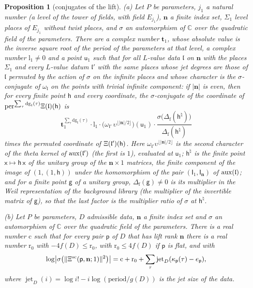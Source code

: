 \documentclass[11pt,a4paper]{article}
\newcommand{\kw}[1]{\emph{#1}}
\theoremstyle{plainx}
\newtheorem{proposition}[theorem]{Proposition}
\theoremstyle{uprightx}
\newcommand{\bn}{\mathbf{n}}
\newcommand{\sI}{\mathsf{I}}
\newcommand{\sg}{\mathsf{g}}
\newcommand{\sh}{\mathsf{h}}
\newcommand{\sx}{\mathsf{x}}
\newcommand{\pp}{\mathsf{p}}
\newcommand{\fl}{\mathfrak{l}}
\newcommand{\rc}{\mathrm{c}}
\newcommand{\CC}{\mathbb{C}}
\begin{document}
\begin{proposition}[conjugates of the lift]\label{p:galois}
\textup{(a)} Let $P$ be parameters, $j_1$ a natural number (a level of the tower of fields, with field $E_{j_1}$),
$\bn$ a finite index set, $\Sigma_1$ level places of $E_{j_1}$ without twist places, and $\sigma$ an automorphism
of $\CC$ over the quadratic field of the parameters. There are a complex number $\mathbf{t}_1$, whose absolute value
is the inverse square root of the period of the parameters at that level, a complex number $\mathrm{l}_1\ne0$ and
a point $\mathsf{u}_1$ such that for all $L$-value data $\fl$ on $\bn$ with the places $\Sigma_1$ and every
$L$-value datum $\fl'$ with the same places whose jet degrees are those of $\fl$ permuted by the action of $\sigma$
on the infinite places and whose character is the $\sigma$-conjugate of $\omega_{\fl}$ on the points with trivial
infinite component: if $|\bn|$ is even, then for every finite point $\sh$ and every coordinate, the
$\sigma$-conjugate of the coordinate of $\mathrm{per}^{\sum_\tau\mathrm{dg}_{\fl}(\tau)}\trivialLift{\fl}(\sh)$ is
\[\mathbf{t}_1^{\sum_\tau\mathrm{dg}_{\fl}(\tau)}\cdot\mathrm{l}_1\cdot\bigl(\omega_{\fl'}\,\upsilon^{\lfloor|\bn|/2\rfloor}\bigr)(\mathsf{u}_1)
\cdot\frac{\sigma\bigl(\Delta_{\mathrm f}(\sh^{\natural})\bigr)}{\Delta_{\mathrm f}(\sh^{\natural})}\]
times the permuted coordinate of $\trivialLift{\fl'}(\sh)$. Here $\omega_{\fl'}\upsilon^{\lfloor|\bn|/2\rfloor}$ is the
second character of the theta kernel of $\auxPair{\fl'}$ (the first is $1$), evaluated at $\mathsf{u}_1$;
$\sh^{\natural}$ is the finite point $\sx\mapsto\sh\,\sx$ of the unitary group of the $\bn\times1$ matrices, the
finite component of the image of $(1,(1,\sh))$ under the homomorphism of the pair $(\sI_1,\sI_{\bn})$ of
$\auxPair{\fl}$; and for a finite point $\sg$ of a unitary group, $\Delta_{\mathrm f}(\sg)\ne0$ is its multiplier in
the Weil representation of the background library (the multiplier of the invertible matrix of $\sg$), so that the
last factor is the \kw{multiplier ratio} of $\sigma$ at $\sh^{\natural}$.

\textup{(b)} Let $P$ be parameters, $D$ admissible data, $\bn$ a finite index set and $\sigma$ an automorphism of
$\CC$ over the quadratic field of the parameters. There is a real number $\rc$ such that for every pair $\pp$ of
$D$ that has lift rank $\bn$ there is a real number $\mathrm{r}_0$ with $-4f(D)\le\mathrm{r}_0$, with
$\mathrm{r}_0\le4f(D)$ if $\pp$ is flat, and with
\[\log\bigl|\sigma\bigl(\|\trivialLifta{\pp,\bn}{1}\|^2\bigr)\bigr|=\rc+\mathrm{r}_0+\sum_\tau\operatorname{jet}_D(\kappa_{\pp}(\tau)-e_{\pp}),\]
where $\operatorname{jet}_D(i)=\log i!-i\log(\text{period}/g(D))$ is the jet size of the data.
\end{proposition}
\end{document}
